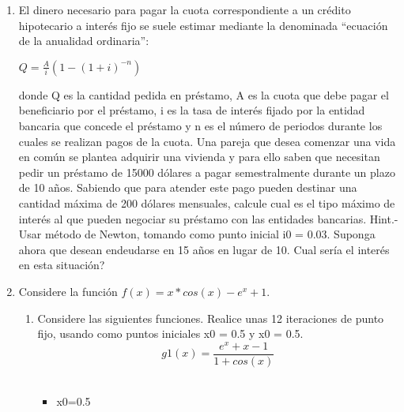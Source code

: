 \documentclass{udparticle}
\begin{document}
\begin{enumerate}
\item El dinero necesario para pagar la cuota correspondiente a un crédito hipotecario a interés fijo se suele
estimar mediante la denominada “ecuación de la anualidad ordinaria”:
\begin{center}
    $ Q = \frac{A}{i}(1-(1+i)^{-n}) $
\end{center}
donde Q es la cantidad pedida en préstamo, A es la cuota que debe pagar el beneficiario por el
préstamo, i es la tasa de interés fijado por la entidad bancaria que concede el préstamo y n es el
número de periodos durante los cuales se realizan pagos de la cuota.
Una pareja que desea comenzar una vida en común se plantea adquirir una vivienda y para ello saben
que necesitan pedir un préstamo de 15000 dólares a pagar semestralmente durante un plazo de 10 años.
Sabiendo que para atender este pago pueden destinar una cantidad máxima de 200 dólares mensuales,
calcule cual es el tipo máximo de interés al que pueden negociar su préstamo con las entidades bancarias.
Hint.- Usar método de Newton, tomando como punto inicial i0 = 0.03.
Suponga ahora que desean endeudarse en 15 años en lugar de 10. Cual sería el interés en esta situación?


\item Considere la función \(f(x) = x*cos(x)-e^x+ 1\). %
\begin{enumerate}
    
\vspace{0.9cm}
\item Considere las siguientes funciones. Realice unas 12 iteraciones de punto fijo, usando como puntos iniciales x0 = 0.5 y x0 = 0.5.\\ 


\begin{equation}
 g1(x) = \frac{e^x+x-1}
{1 + cos(x)}
\end{equation}
\\
\begin{itemize}
\item x0=0.5
\end{itemize}


\begin{table}[H]
    \centering
        \begin{tabular} { |c|c|}
        

\end{tabular}
\end{table}
\end{enumerate}
\end{enumerate}
\end{document}
